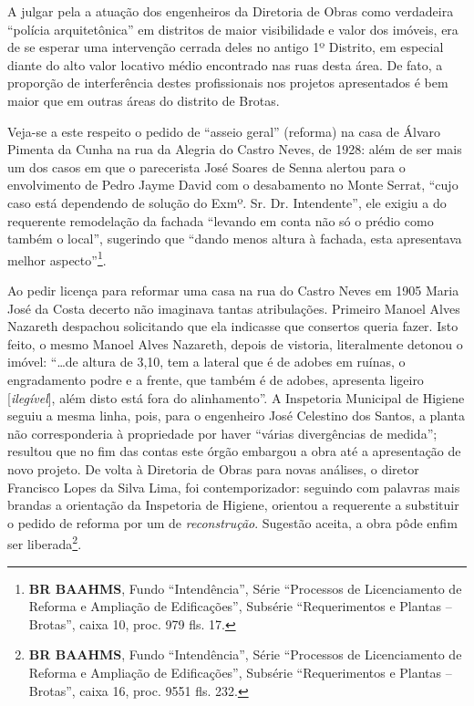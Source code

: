 
A julgar pela a atuação dos engenheiros da Diretoria de Obras como verdadeira ``polícia arquitetônica'' em distritos de maior visibilidade e valor dos imóveis\cite{almeida_victoria_1997, almeida_vitrinescomercio_2014}, era de se esperar uma intervenção cerrada deles no antigo 1º Distrito, em especial diante do alto valor locativo médio encontrado nas ruas desta área. De fato, a proporção de interferência destes profissionais nos projetos apresentados é bem maior que em outras áreas do distrito de Brotas.

Veja-se a este respeito o pedido de ``asseio geral'' (reforma) na casa de Álvaro Pimenta da Cunha na rua da Alegria do Castro Neves, de 1928: além de ser mais um dos casos em que o parecerista José Soares de Senna alertou para o envolvimento de Pedro Jayme David com o desabamento no Monte Serrat, ``cujo caso está dependendo de solução do Exmº. Sr. Dr. Intendente'', ele exigiu a do requerente remodelação da fachada ``levando em conta não só o prédio como também o local'', sugerindo que ``dando menos altura à fachada, esta apresentava melhor aspecto''\footnote{\textbf{BR BAAHMS}, Fundo ``Intendência'', Série ``Processos de Licenciamento de Reforma e Ampliação de Edificações'', Subsérie ``Requerimentos e Plantas – Brotas'', caixa 10, proc. 979 fls. 17.}.

Ao pedir licença para reformar uma casa na rua do Castro Neves em 1905 Maria José da Costa decerto não imaginava tantas atribulações. Primeiro Manoel Alves Nazareth despachou solicitando que ela indicasse que consertos queria fazer. Isto feito, o mesmo Manoel Alves Nazareth, depois de vistoria, literalmente detonou o imóvel: ``\dots de altura de 3,10, tem a lateral que é de adobes em ruínas, o engradamento podre e a frente, que também é de adobes, apresenta ligeiro [\textit{ilegível}], além disto está fora do alinhamento''. A Inspetoria Municipal de Higiene seguiu a mesma linha, pois, para o engenheiro José Celestino dos Santos, a planta não corresponderia à propriedade por haver ``várias divergências de medida''; resultou que no fim das contas este órgão embargou a obra até a apresentação de novo projeto. De volta à Diretoria de Obras para novas análises, o diretor Francisco Lopes da Silva Lima, foi contemporizador: seguindo com palavras mais brandas a orientação da Inspetoria de Higiene, orientou a requerente a substituir o pedido de reforma por um de \textit{reconstrução}. Sugestão aceita, a obra pôde enfim ser liberada\footnote{\textbf{BR BAAHMS}, Fundo ``Intendência'', Série ``Processos de Licenciamento de Reforma e Ampliação de Edificações'', Subsérie ``Requerimentos e Plantas -- Brotas'', caixa 16, proc. 9551 fls. 232.}.

